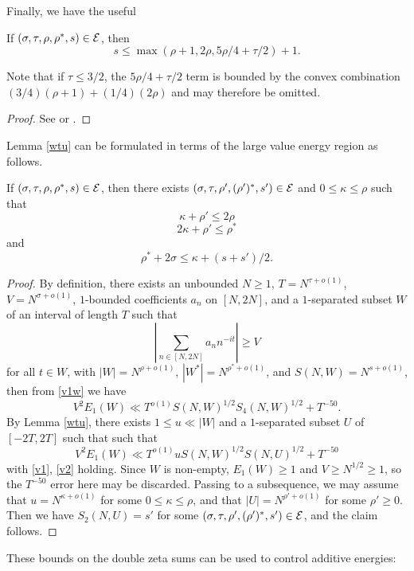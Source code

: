 Finally, we have the useful

\begin{lemma}\label{hb-double}  If $(\sigma,\tau,\rho,\rho^*,s) \in \mathcal{E}$, then
    $$ s \leq \max( \rho+1, 2\rho, 5\rho/4+\tau/2) + 1.$$
\end{lemma}

Note that if $\tau \leq 3/2$, the $5\rho/4+\tau/2$ term is bounded by the convex combination $(3/4)(\rho+1)+(1/4)(2\rho)$ and may therefore be omitted.

\begin{proof} See \cite[Theorem 1]{heathbrown_large_1979} or \cite[Lemma 11.5]{ivic}.
\end{proof}

Lemma \ref{wtu} can be formulated in terms of the large value energy region as follows.

\begin{lemma}\label{wtu-alt}  If $(\sigma,\tau,\rho,\rho^*,s) \in \mathcal{E}$, then there exists $(\sigma,\tau,\rho',(\rho')^*,s') \in \mathcal{E}$ and $0 \leq \kappa \leq \rho$ such that
$$ \kappa + \rho' \leq 2 \rho$$
$$ 2\kappa + \rho' \leq \rho^*$$
and
$$ \rho^* + 2\sigma \leq \kappa + (s+s')/2.$$
\end{lemma}


\begin{proof}  By definition, there exists an unbounded $N \geq 1$, $T = N^{\tau+o(1)}$, $V = N^{\sigma+o(1)}$, $1$-bounded coefficients $a_n$ on $[N,2N]$, and a $1$-separated subset $W$ of an interval of length $T$ such that
$$ |\sum_{n \in [N,2N]} a_n n^{-it}| \geq V$$
for all $t \in W$, with $|W| = N^{\rho+o(1)}$, $|W^*| = N^{\rho^*+o(1)}$, and $S(N,W) = N^{s+o(1)}$, then from \eqref{v1w} we have
$$
    V^2 E_1(W) \ll T^{o(1)} S(N,W)^{1/2} S_4(N,W)^{1/2} + T^{-50}.
$$
By Lemma \ref{wtu}, there exists $1 \leq u \ll |W|$ and a $1$-separated subset $U$ of $[-2T,2T]$ such that
 such that
$$
    V^2 E_1(W) \ll T^{o(1)} u S(N,W)^{1/2} S(N,U)^{1/2} + T^{-50}
$$
with \eqref{v1}, \eqref{v2} holding.  Since $W$ is non-empty, $E_1(W) \geq 1$ and $V \geq N^{1/2} \geq 1$, so the $T^{-50}$ error here may be discarded.  Passing to a subsequence, we may assume that $u = N^{\kappa+o(1)}$ for some $0 \leq \kappa \leq \rho$, and that $|U| = N^{\rho'+o(1)}$ for some $\rho' \geq 0$.  Then we have $S_2(N,U) = s'$ for some
$(\sigma,\tau,\rho',(\rho')^*,s') \in \mathcal{E}$, and the claim follows.
\end{proof}

These bounds on the double zeta sums can be used to control additive energies:

